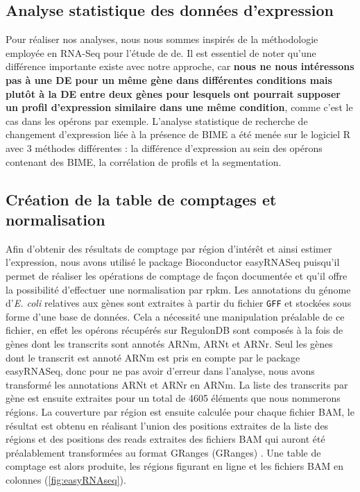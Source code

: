 \documentclass[12pt,a4paper]{report}
\begin{document}
\begin{onehalfspace}
\section*{Analyse statistique des données d'expression}
Pour réaliser nos analyses, nous nous sommes inspirés de la méthodologie employée en RNA-Seq pour l'étude de \gls{de}. Il est essentiel de noter qu'une différence importante existe avec notre approche, car \textbf{nous ne nous intéressons pas à une DE pour un m\^eme gène dans différentes conditions mais plutôt à la DE entre deux gènes pour lesquels ont pourrait supposer un profil d'expression similaire dans une même condition}, comme c'est le cas dans les opérons par exemple. L'analyse statistique de recherche de changement d'expression liée à la présence de BIME a été menée sur le logiciel R avec 3 méthodes différentes : la différence d'expression au sein des opérons contenant des BIME, la corrélation de profils et la segmentation.

\subsection*{Création de la table de comptages et normalisation}
Afin d'obtenir des résultats de comptage par région d'intérêt et ainsi estimer l'expression, nous avons utilisé le package Bioconductor easyRNASeq \citep{Delhomme2012} puisqu'il permet de réaliser les opérations de comptage de façon documentée et qu'il offre la possibilité d'effectuer une normalisation par \gls{rpkm}. Les annotations du génome d'\textit{E. coli} relatives aux gènes sont extraites à partir du fichier \texttt{GFF} et stockées sous forme d'une base de données. Cela a nécessité une manipulation préalable de ce fichier, en effet les opérons récupérés sur RegulonDB sont composés à la fois de gènes dont les transcrits sont annotés ARNm, ARNt et ARNr. Seul les gènes dont le transcrit est annoté ARNm est pris en compte par le package easyRNASeq, donc pour ne pas avoir d'erreur dans l'analyse, nous avons transformé les annotations ARNt et ARNr en ARNm.
La liste des transcrits par gène est ensuite extraites pour un total de 4605 éléments que nous nommerons régions. La couverture par région est ensuite calculée pour chaque fichier BAM, le résultat est obtenu en réalisant l'union des positions extraites de la liste des régions et des positions des reads extraites des fichiers BAM qui auront été préalablement transformées au format \gls{GRanges} (GRanges)  \citep{Lawrence2013}. Une table de comptage est alors produite, les régions figurant en ligne et les fichiers BAM en colonnes (\autoref{fig:easyRNAseq}).


\end{onehalfspace}
\end{document}
